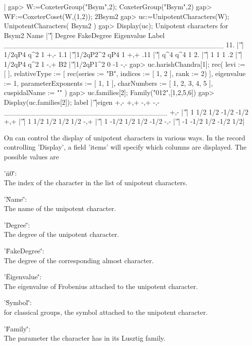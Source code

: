 |    gap> W:=CoxeterGroup("Bsym",2);
    CoxeterGroup("Bsym",2)
    gap> WF:=CoxeterCoset(W,(1,2));
    2Bsym2
    gap> uc:=UnipotentCharacters(W);
    UnipotentCharacters( Bsym2 )
    gap> Display(uc);
    Unipotent characters for Bsym2
    Name |'\|'|  Degree FakeDegree Eigenvalue Label
    ___________________________________________
    11.  |'\|'|  1/2qP4        q^2          1   +,-
    1.1  |'\|'|1/2qP2^2        qP4          1   +,+
    .11  |'\|'|     q^4        q^4          1
    2.   |'\|'|       1          1          1
    .2   |'\|'|  1/2qP4        q^2          1   -,+
    B2   |'\|'|1/2qP1^2          0         -1   -,-
    gap> uc.harishChandra[1];
    rec(
      levi := [  ],
      relativeType := [ rec(series  := "B",
	      indices := [ 1, 2 ],
	      rank    := 2) ],
      eigenvalue := 1,
      parameterExponents := [ 1, 1 ],
      charNumbers := [ 1, 2, 3, 4, 5 ],
      cuspidalName := "" )
    gap> uc.families[2];
    Family("012",[1,2,5,6])
    gap> Display(uc.families[2]);
    label |'\|'|eigen  +,- +,+  -,+  -,-
    ________________________________
    +,-   |'\|'|    1  1/2 1/2 -1/2 -1/2
    +,+   |'\|'|    1  1/2 1/2  1/2  1/2
    -,+   |'\|'|    1 -1/2 1/2  1/2 -1/2
    -,-   |'\|'|   -1 -1/2 1/2 -1/2  1/2|


On can control the display of unipotent characters in various ways.
In the record controlling 'Display', a field 'items' will specify
which columns are displayed. The possible values are

'\"n0\"':\\  The index of the character in the list of unipotent characters.

'\"Name\"':\\   The name of the unipotent character.

'\"Degree\"':\\  The degree of the unipotent character.

'\"FakeDegree\"':\\ The degree of the corresponding almost character.

'\"Eigenvalue\"':\\  The eigenvalue of Frobenius attached to the unipotent
character.

'\"Symbol\"':\\ for classical groups, the symbol attached to the unipotent
character.

'\"Family\"':\\ The parameter the character has in its Lusztig family.


